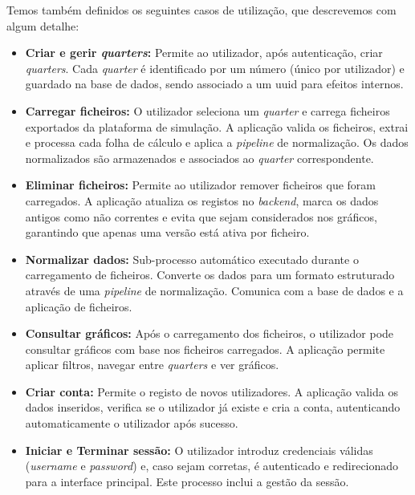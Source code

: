 Temos também definidos os seguintes casos de utilização, que descrevemos com algum detalhe:
\begin{itemize}
    \item \textbf{Criar e gerir \textit{quarters}:} Permite ao utilizador, após autenticação, criar \textit{quarters}. Cada \textit{quarter} é identificado por um número (único por utilizador) e guardado na base de dados, sendo associado a um \gls{uuid} para efeitos internos.

    \item \textbf{Carregar ficheiros:} O utilizador seleciona um \textit{quarter} e carrega ficheiros exportados da plataforma de simulação. A aplicação valida os ficheiros, extrai e processa cada folha de cálculo e aplica a \textit{pipeline} de normalização. Os dados normalizados são armazenados e associados ao \textit{quarter} correspondente.

    \item \textbf{Eliminar ficheiros:} Permite ao utilizador remover ficheiros que foram carregados. A aplicação atualiza os registos no \textit{backend}, marca os dados antigos como não correntes e evita que sejam considerados nos gráficos, garantindo que apenas uma versão está ativa por ficheiro.

    \item \textbf{Normalizar dados:} Sub-processo automático executado durante o carregamento de ficheiros. Converte os dados para um formato estruturado através de uma \textit{pipeline} de normalização. Comunica com a base de dados e a aplicação de ficheiros.

    \item \textbf{Consultar gráficos:} Após o carregamento dos ficheiros, o utilizador pode consultar gráficos com base nos ficheiros carregados. A aplicação permite aplicar filtros, navegar entre \textit{quarters} e ver gráficos.

    \item \textbf{Criar conta:} Permite o registo de novos utilizadores. A aplicação valida os dados inseridos, verifica se o utilizador já existe e cria a conta, autenticando automaticamente o utilizador após sucesso.

    \item \textbf{Iniciar e Terminar sessão:} O utilizador introduz credenciais válidas (\textit{username} e \textit{password}) e, caso sejam corretas, é autenticado e redirecionado para a interface principal. Este processo inclui a gestão da sessão.

\end{itemize}

